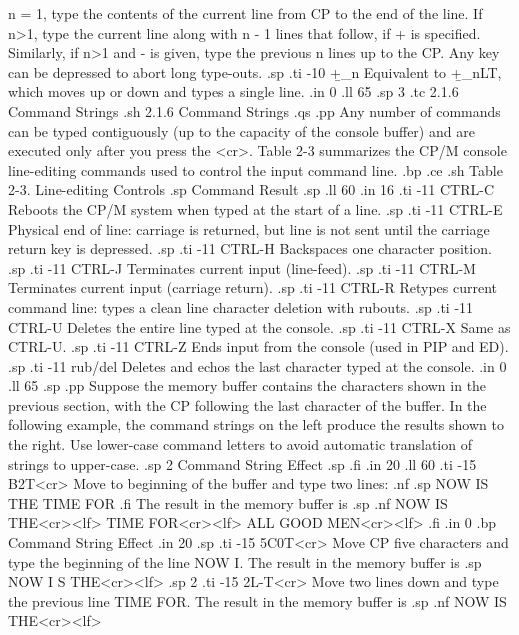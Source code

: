 n = 1, type the contents of the current line from CP to the end of the line.  
If n>1, type the current line along with n - 1 lines that follow, if + is 
specified.  Similarly, if n>1 and - is given, type the previous n lines up to 
the CP.  Any key can be depressed to abort long type-outs.
.sp
.ti -10
+\b_n        Equivalent to +\b_nLT, which moves up or down and types a 
single line.
.in 0
.ll 65
.sp 3
.tc         2.1.6  Command Strings
.sh
2.1.6  Command Strings
.qs
.pp
Any number of commands can be typed contiguously (up to the capacity of 
the console buffer) and are executed only after you press the <cr>.  Table 2-3
summarizes the CP/M console line-editing commands used to control the input 
command line.
.bp 
.ce
.sh
Table 2-3.  Line-editing Controls
.sp
     Command                      Result
.sp
.ll 60
.in 16
.ti -11
CTRL-C     Reboots the CP/M system when typed at the start of a line. 
.sp
.ti -11
CTRL-E     Physical end of line:  carriage is returned, but line is not sent 
until the carriage return key is depressed.
.sp
.ti -11
CTRL-H     Backspaces one character position.
.sp
.ti -11
CTRL-J     Terminates current input (line-feed).
.sp
.ti -11
CTRL-M     Terminates current input (carriage return).
.sp
.ti -11
CTRL-R     Retypes current command line:  types a clean line character 
deletion with rubouts.
.sp
.ti -11
CTRL-U     Deletes the entire line typed at the console.
.sp
.ti -11
CTRL-X     Same as CTRL-U.
.sp
.ti -11
CTRL-Z     Ends input from the console (used in PIP and ED).
.sp
.ti -11
rub/del    Deletes and echos the last character typed at the 
console.
.in 0
.ll 65
.sp
.pp
Suppose the memory buffer contains the characters shown in the 
previous section, with the CP following the last character of the 
buffer.  In the following example, the command strings on the left produce 
the results shown to the right.  Use lower-case command letters to avoid 
automatic translation of strings to upper-case.
.sp 2 
  Command String                      Effect
.sp
.fi
.in 20
.ll 60
.ti -15
B2T<cr>        Move to beginning of the buffer and type two lines:  
.nf
.sp
NOW IS THE
TIME FOR
.fi
The result in the memory buffer is   
.sp
.nf
NOW IS THE<cr><lf>
TIME FOR<cr><lf>
ALL GOOD MEN<cr><lf>
.fi
.in 0
.bp
  Command String                      Effect
.in 20
.sp
.ti -15
5C0T<cr>       Move CP five characters and type the beginning of the line NOW 
I.  The result in the memory buffer is 
.sp
NOW I  S THE<cr><lf>
.sp 2
.ti -15
2L-T<cr>       Move two lines down and type the previous line TIME FOR.  
The result in the memory buffer is        
.sp
.nf
NOW IS THE<cr><lf>  
